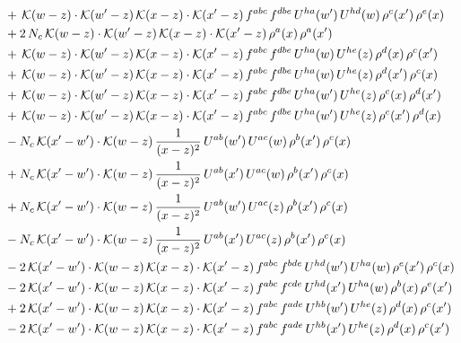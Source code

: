 \documentclass[9pt]{article}
\numberwithin{equation}{section}
\begin{document}
\begin{align}
&+\,\mathcal{K}(w-z)\cdot\mathcal{K}(w'-z)\,\mathcal{K}(x-z)\cdot\mathcal{K}(x'-z)\,f^{abc}\,f^{dbe}\,U^{ha}(w')\,U^{hd}(w)\,\rho^{c}(x')\,\rho^{e}(x)\notag\\
&+2\,N_{c}\,\mathcal{K}(w-z)\cdot\mathcal{K}(w'-z)\,\mathcal{K}(x-z)\cdot\mathcal{K}(x'-z)\,\rho^{a}(x)\,\rho^{a}(x')\notag\\
&+\,\mathcal{K}(w-z)\cdot\mathcal{K}(w'-z)\,\mathcal{K}(x-z)\cdot\mathcal{K}(x'-z)\,f^{abc}\,f^{dbe}\,U^{ha}(w)\,U^{he}(z)\,\rho^{d}(x)\,\rho^{c}(x')\notag\\
&+\,\mathcal{K}(w-z)\cdot\mathcal{K}(w'-z)\,\mathcal{K}(x-z)\cdot\mathcal{K}(x'-z)\,f^{abc}\,f^{dbe}\,U^{ha}(w)\,U^{he}(z)\,\rho^{d}(x')\,\rho^{c}(x)\notag\\
&+\,\mathcal{K}(w-z)\cdot\mathcal{K}(w'-z)\,\mathcal{K}(x-z)\cdot\mathcal{K}(x'-z)\,f^{abc}\,f^{dbe}\,U^{ha}(w')\,U^{he}(z)\,\rho^{c}(x)\,\rho^{d}(x')\notag\\
&+\,\mathcal{K}(w-z)\cdot\mathcal{K}(w'-z)\,\mathcal{K}(x-z)\cdot\mathcal{K}(x'-z)\,f^{abc}\,f^{dbe}\,U^{ha}(w')\,U^{he}(z)\,\rho^{c}(x')\,\rho^{d}(x)\notag\\
&-N_{c}\,\mathcal{K}(x'-w')\cdot\mathcal{K}(w-z)\,\frac{1}{(x-z)^{2}}\,U^{ab}(w')\,U^{ac}(w)\,\rho^{b}(x')\,\rho^{c}(x)\notag\\
&+N_{c}\,\mathcal{K}(x'-w')\cdot\mathcal{K}(w-z)\,\frac{1}{(x-z)^{2}}\,U^{ab}(x')\,U^{ac}(w)\,\rho^{b}(x')\,\rho^{c}(x)\notag\\
&+N_{c}\,\mathcal{K}(x'-w')\cdot\mathcal{K}(w-z)\,\frac{1}{(x-z)^{2}}\,U^{ab}(w')\,U^{ac}(z)\,\rho^{b}(x')\,\rho^{c}(x)\notag\\
&-N_{c}\,\mathcal{K}(x'-w')\cdot\mathcal{K}(w-z)\,\frac{1}{(x-z)^{2}}\,U^{ab}(x')\,U^{ac}(z)\,\rho^{b}(x')\,\rho^{c}(x)\notag\\
&-2\,\mathcal{K}(x'-w')\cdot\mathcal{K}(w-z)\,\mathcal{K}(x-z)\cdot\mathcal{K}(x'-z)\,f^{abc}\,f^{bde}\,U^{hd}(w')\,U^{ha}(w)\,\rho^{e}(x')\,\rho^{c}(x)\notag\\
&-2\,\mathcal{K}(x'-w')\cdot\mathcal{K}(w-z)\,\mathcal{K}(x-z)\cdot\mathcal{K}(x'-z)\,f^{abc}\,f^{cde}\,U^{hd}(x')\,U^{ha}(w)\,\rho^{b}(x)\,\rho^{e}(x')\notag\\
&+2\,\mathcal{K}(x'-w')\cdot\mathcal{K}(w-z)\,\mathcal{K}(x-z)\cdot\mathcal{K}(x'-z)\,f^{abc}\,f^{ade}\,U^{hb}(w')\,U^{he}(z)\,\rho^{d}(x)\,\rho^{c}(x')\notag\\
&-2\,\mathcal{K}(x'-w')\cdot\mathcal{K}(w-z)\,\mathcal{K}(x-z)\cdot\mathcal{K}(x'-z)\,f^{abc}\,f^{ade}\,U^{hb}(x')\,U^{he}(z)\,\rho^{d}(x)\,\rho^{c}(x')\notag\\

\end{align}
\end{document}

